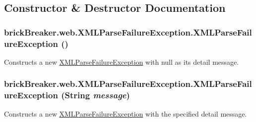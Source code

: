 \subsection{Constructor \& Destructor Documentation}
\hypertarget{classbrick_breaker_1_1web_1_1_x_m_l_parse_failure_exception_a723d3ff61adb79b5cf401fe14c1832df}{
\subsubsection[{XMLParseFailureException}]{\setlength{\rightskip}{0pt plus 5cm}brickBreaker.web.XMLParseFailureException.XMLParseFailureException ()}}
\label{classbrick_breaker_1_1web_1_1_x_m_l_parse_failure_exception_a723d3ff61adb79b5cf401fe14c1832df}
Constructs a new {\ttfamily \hyperlink{classbrick_breaker_1_1web_1_1_x_m_l_parse_failure_exception}{XMLParseFailureException}} with {\ttfamily null} as its detail message. \hypertarget{classbrick_breaker_1_1web_1_1_x_m_l_parse_failure_exception_af66e18584855ce1dad5cc16b68ca7df1}{
\subsubsection[{XMLParseFailureException}]{\setlength{\rightskip}{0pt plus 5cm}brickBreaker.web.XMLParseFailureException.XMLParseFailureException (String {\em message})}}
\label{classbrick_breaker_1_1web_1_1_x_m_l_parse_failure_exception_af66e18584855ce1dad5cc16b68ca7df1}
Constructs a new {\ttfamily \hyperlink{classbrick_breaker_1_1web_1_1_x_m_l_parse_failure_exception}{XMLParseFailureException}} with the specified detail message.


